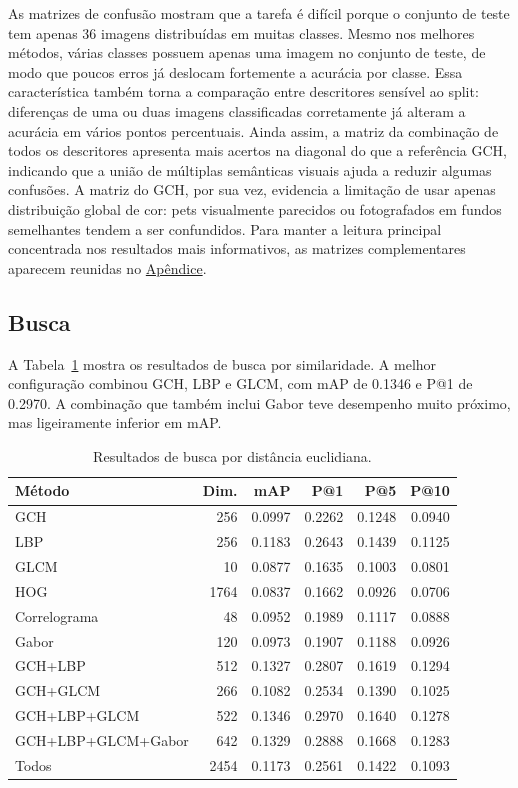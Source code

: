 \documentclass[12pt,a4paper]{article}
\begin{document}
As matrizes de confusão mostram que a tarefa é difícil porque o conjunto de teste tem apenas 36 imagens distribuídas em muitas classes. Mesmo nos melhores métodos, várias classes possuem apenas uma imagem no conjunto de teste, de modo que poucos erros já deslocam fortemente a acurácia por classe. Essa característica também torna a comparação entre descritores sensível ao split: diferenças de uma ou duas imagens classificadas corretamente já alteram a acurácia em vários pontos percentuais. Ainda assim, a matriz da combinação de todos os descritores apresenta mais acertos na diagonal do que a referência GCH, indicando que a união de múltiplas semânticas visuais ajuda a reduzir algumas confusões. A matriz do GCH, por sua vez, evidencia a limitação de usar apenas distribuição global de cor: pets visualmente parecidos ou fotografados em fundos semelhantes tendem a ser confundidos. Para manter a leitura principal concentrada nos resultados mais informativos, as matrizes complementares aparecem reunidas no \hyperref[sec:confusion-matrices]{Apêndice}.

\subsection{Busca}

A Tabela~\ref{tab:retrieval} mostra os resultados de busca por similaridade. A melhor configuração combinou GCH, LBP e GLCM, com mAP de 0.1346 e P@1 de 0.2970. A combinação que também inclui Gabor teve desempenho muito próximo, mas ligeiramente inferior em mAP.

\begin{table}[H]
\centering
\caption{Resultados de busca por distância euclidiana.}
\label{tab:retrieval}
\small
\begin{tabular}{lrrrrr}
\toprule
Método & Dim. & mAP & P@1 & P@5 & P@10 \\
\midrule
GCH & 256 & 0.0997 & 0.2262 & 0.1248 & 0.0940 \\
LBP & 256 & 0.1183 & 0.2643 & 0.1439 & 0.1125 \\
GLCM & 10 & 0.0877 & 0.1635 & 0.1003 & 0.0801 \\
HOG & 1764 & 0.0837 & 0.1662 & 0.0926 & 0.0706 \\
Correlograma & 48 & 0.0952 & 0.1989 & 0.1117 & 0.0888 \\
Gabor & 120 & 0.0973 & 0.1907 & 0.1188 & 0.0926 \\
GCH+LBP & 512 & 0.1327 & 0.2807 & 0.1619 & 0.1294 \\
GCH+GLCM & 266 & 0.1082 & 0.2534 & 0.1390 & 0.1025 \\
GCH+LBP+GLCM & 522 & 0.1346 & 0.2970 & 0.1640 & 0.1278 \\
GCH+LBP+GLCM+Gabor & 642 & 0.1329 & 0.2888 & 0.1668 & 0.1283 \\
Todos & 2454 & 0.1173 & 0.2561 & 0.1422 & 0.1093 \\
\bottomrule
\end{tabular}
\end{table}
\end{document}
